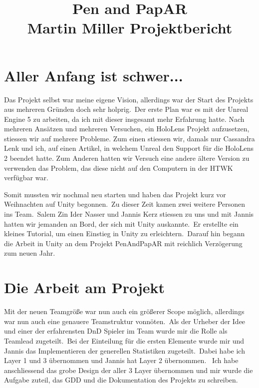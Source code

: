 \documentclass[11pt]{article}
\begin{document}
    \title{Pen and PapAR \\ \large \textminus Martin Miller Projektbericht \textminus}

    \maketitle

    \section{Aller Anfang ist schwer...}\label{sec:chapter_beginning}
    Das Projekt selbst war meine eigene Vision, allerdings war der Start des Projekts aus mehreren Gründen doch sehr
    holprig.\ Der erste Plan war es mit der Unreal Engine 5 zu arbeiten, da ich mit dieser insgesamt mehr Erfahrung hatte.
    Nach mehreren Ansätzen und mehreren Versuchen, ein HoloLens Projekt aufzusetzen, stiessen wir auf mehrere Probleme.
    Zum einen stiessen wir, damals nur Cassandra Lenk und ich, auf einen Artikel, in welchem Unreal den Support für die
    HoloLens 2 beendet hatte.
    Zum Anderen hatten wir Versuch eine andere ältere Version zu verwenden das Problem, das diese nicht auf den Computern
    in der HTWK verfügbar war.

    Somit mussten wir nochmal neu starten und haben das Projekt kurz vor Weihnachten auf Unity begonnen.\ Zu dieser Zeit
    kamen zwei weitere Personen ins Team.\ Salem Zin Ider Nasser und Jannis Kerz stiessen zu uns und mit Jannis hatten
    wir jemanden an Bord, der sich mit Unity auskannte.\ Er erstellte ein kleines Tutorial, um einen Einstieg in Unity zu
    erleichtern.\ Darauf hin begann die Arbeit in Unity an dem Projekt PenAndPapAR mit reichlich Verzögerung zum neuen
    Jahr.
    
    \section{Die Arbeit am Projekt}\label{sec:chapter_working_on_penandpapar}
    Mit der neuen Teamgröße war nun auch ein größerer Scope möglich, allerdings war nun auch eine genauere Teamstruktur
    vonnöten.\ Als der Urheber der Idee und einer der erfahrensten DnD Spieler im Team wurde mir die Rolle als Teamlead
    zugeteilt.\ Bei der Einteilung für die ersten Elemente wurde mir und Jannis das Implementieren der generellen
    Statistiken zugeteilt.\ Dabei habe ich Layer 1 und 3 übernommen und Jannis hat Layer 2 übernommen. \ Ich habe
    anschliessend das grobe Design der aller 3 Layer übernommen und mir wurde die Aufgabe zuteil, das GDD und die
    Dokumentation des Projekts zu schreiben.
\end{document}

